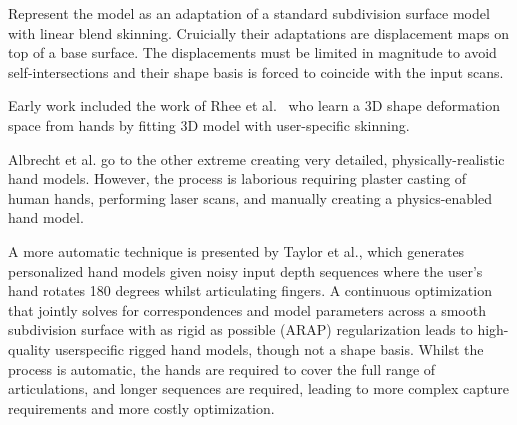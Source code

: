 
Represent the model as an adaptation of a standard subdivision surface model with linear blend skinning. Cruicially their adaptations are displacement maps on top of a base surface. The displacements must be limited in magnitude to avoid self-intersections and their shape basis is forced to coincide with the input scans.


Early work included the work of Rhee et al.~\cite{xxx} who learn a 3D shape deformation space from hands by fitting 3D model with user-specific skinning. 


Albrecht et al. go to the other extreme creating very detailed, physically-realistic hand models. However, the process is laborious requiring plaster casting of human hands, performing laser scans, and manually creating a physics-enabled hand model.


A more automatic technique is presented by Taylor et al., which generates personalized hand models given noisy input depth sequences where the user’s hand rotates 180 degrees whilst articulating fingers. A continuous optimization that jointly solves for correspondences and model parameters across a smooth subdivision surface with as rigid as possible (ARAP) regularization leads to high-quality userspecific rigged hand models, though not a shape basis. Whilst the process is automatic, the hands are required to cover the full range of articulations, and longer sequences are required, leading to more complex capture requirements and more costly optimization.


